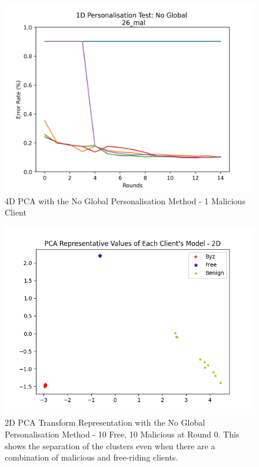 \begin{figure}[htbp]
	\centering
    \includegraphics[scale=0.5]{my_agg/graphs/1d_no_global.png}
    \caption{4D PCA with the No Global Personalisation Method - 1 Malicious Client}
	\label{fig:4D_no_global_1}
\end{figure}

\begin{figure}[htbp]
	\centering
    \includegraphics[scale=0.5]{my_agg/graphs/10mal_10free_r0_no_global.png}
    \caption{2D PCA Transform Representation with the No Global Personalisation Method - 10 Free, 10 Malicious at Round 0. This shows the separation of the clusters even when there are a combination of malicious and free-riding clients.}
	\label{fig:10mal10free_rep}
\end{figure}

